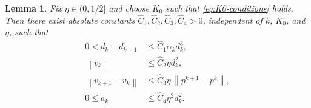 \documentclass[11pt]{article}
\numberwithin{equation}{section}
\newtheorem{lemma}[theorem]{Lemma}
\newcommand{\norm}[1]{\left\lVert #1\right\rVert}
\begin{document}
\begin{lemma}
\label{lem:elementary}
Fix \(\eta\in(0,1/2]\) and choose \(K_0\) such that
\eqref{eq:K0-conditions} holds. Then there exist absolute constants
\(\widehat C_1,\widehat C_2,\widehat C_3,\widehat C_4>0\), independent
of \(k\), \(K_0\), and \(\eta\), such that
\begin{align}
    0<d_k-d_{k+1}
    &\leq \widehat C_1\alpha_kd_k^3,
    \label{eq:d-first}\\
    \norm{v_k}
    &\leq \widehat C_2\eta d_k^2,
    \label{eq:v-size}\\
    \norm{v_{k+1}-v_k}
    &\leq \widehat C_3\eta\,\norm{p^{k+1}-p^k},
    \label{eq:v-consecutive}\\
    0\leq a_k
    &\leq \widehat C_4\eta^2d_k^2.
    \label{eq:a-size}
\end{align}
\end{lemma}
\end{document}
